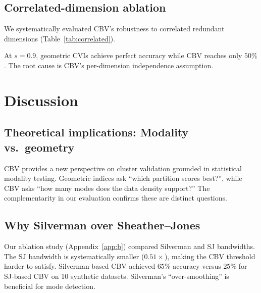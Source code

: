 \documentclass[journal]{IEEEtran}
\begin{document}
\subsection{Correlated-dimension ablation}
\label{sec:correlated-ablation}

We systematically evaluated CBV's robustness to correlated redundant dimensions (Table~\ref{tab:correlated}).

\begin{table}[t]
\centering
\caption{Accuracy by Correlation Strength}
\label{tab:correlated}
\end{table}

At $s = 0.9$, geometric CVIs achieve perfect accuracy while CBV reaches only $50\%$. The root cause is CBV's per-dimension independence assumption.

\section{Discussion}
\label{sec:discussion}

\subsection{Theoretical implications: Modality vs.\ geometry}
\label{sec:theoretical-implications}

CBV provides a new perspective on cluster validation grounded in statistical modality testing. Geometric indices ask ``which partition scores best?'', while CBV asks ``how many modes does the data density support?'' The complementarity in our evaluation confirms these are distinct questions.

\subsection{Why Silverman over Sheather--Jones}
\label{sec:why-silverman}

Our ablation study (Appendix~\ref{app:b}) compared Silverman and SJ bandwidths. The SJ bandwidth is systematically smaller ($0.51\times$), making the CBV threshold harder to satisfy. Silverman-based CBV achieved $65\%$ accuracy versus $25\%$ for SJ-based CBV on 10 synthetic datasets. Silverman's ``over-smoothing'' is beneficial for mode detection.
\end{document}

